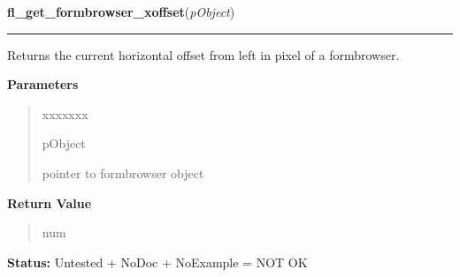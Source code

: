 \hspace{.8\funcindent}\begin{boxedminipage}{\funcwidth}

    \raggedright \textbf{fl\_get\_formbrowser\_xoffset}(\textit{pObject})

    \vspace{-1.5ex}

    \rule{\textwidth}{0.5\fboxrule}
\setlength{\parskip}{2ex}
    Returns the current horizontal offset from left in pixel of a 
    formbrowser.

\setlength{\parskip}{1ex}
      \textbf{Parameters}
      \vspace{-1ex}

      \begin{quote}
        \begin{Ventry}{xxxxxxx}

          \item[pObject]

          pointer to formbrowser object

        \end{Ventry}

      \end{quote}

      \textbf{Return Value}
    \vspace{-1ex}

      \begin{quote}
      num

      \end{quote}

\textbf{Status:} Untested + NoDoc + NoExample = NOT OK



    \end{boxedminipage}

    \label{xformslib:library:fl_get_formbrowser_yoffset}

    \vspace{0.5ex}

